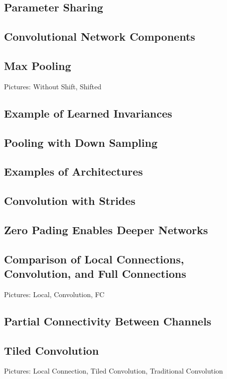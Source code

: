 \documentclass[]{article}
\begin{document}
\subsection{Parameter Sharing}

\subsection{Convolutional Network Components}

\subsection{Max Pooling}
Pictures: Without Shift, Shifted

\subsection{Example of Learned Invariances}

\subsection{Pooling with Down Sampling}

\subsection{Examples of Architectures}

\subsection{Convolution with Strides}

\subsection{Zero Pading Enables Deeper Networks}

\subsection{Comparison of Local Connections, Convolution, and Full Connections}
Pictures: Local, Convolution, FC

\subsection{Partial Connectivity Between Channels}

\subsection{Tiled Convolution}
Pictures: Local Connection, Tiled Convolution, Traditional Convolution
\end{document}
